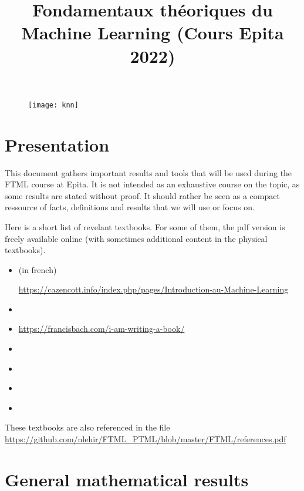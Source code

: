 \documentclass[
10pt, %
a4paper, %
oneside, %
headinclude,footinclude, %
BCOR5mm, %
]{scrartcl}
\title{{Fondamentaux théoriques du Machine Learning (Cours Epita 2022)}}
\author{\spacedlowsmallcaps{Nicolas Le Hir}}
\date{}
\begin{document}
\renewcommand{\sectionmark}[1]{\markright{\spacedlowsmallcaps{#1}}}
\lehead{\mbox{\llap{\small\thepage\kern1em\color{halfgray} \vline}\color{halfgray}\hspace{0.5em}\rightmark\hfil}} 
\pagestyle{scrheadings}
\maketitle 
\setcounter{tocdepth}{3} 

\begin{figure}[htpb]
    \centering
    \texttt{[image: knn]}
    \label{fig:knn}
\end{figure}

\tableofcontents

\section*{\large\color{Blue}Presentation}

This document gathers important results and tools that will be used during the FTML course at Epita. It is not intended as an exhaustive course on the topic, as some results are stated without proof. It should rather be seen as a compact ressource of facts, definitions and results that we will use or focus on.

Here is a short list of revelant textbooks. For some of them, the pdf version is freely available online (with sometimes additional content in the physical textbooks).
\begin{itemize}
    \item \cite{Azencott2022}  (in french)

\url{https://cazencott.info/index.php/pages/Introduction-au-Machine-Learning} 
\item \cite{Alpaydin} 
\item \cite{Bach2021} 

\url{https://francisbach.com/i-am-writing-a-book/} 
\item \cite{Shalev-Shwartz2013} 
\item \cite{Cornuejols2003} 
\item \cite{Allaire2012} 
\item \cite{Hastie2009} 
\end{itemize}

These textbooks are also referenced in the file
\url{https://github.com/nlehir/FTML_PTML/blob/master/FTML/references.pdf} 

\section{\large\color{Blue}General mathematical results}
\end{document}
